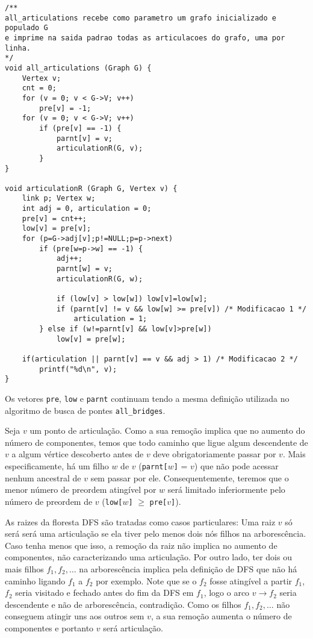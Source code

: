 \documentclass[12pt, a4paper, oneside]{article}
\begin{document}
\begin{lstlisting}
/**
all_articulations recebe como parametro um grafo inicializado e populado G
e imprime na saida padrao todas as articulacoes do grafo, uma por linha.
*/
void all_articulations (Graph G) {
	Vertex v;
	cnt = 0;
	for (v = 0; v < G->V; v++)
		pre[v] = -1;
	for (v = 0; v < G->V; v++)
		if (pre[v] == -1) {
			parnt[v] = v;
			articulationR(G, v);
		}
}

void articulationR (Graph G, Vertex v) {
	link p; Vertex w;
	int adj = 0, articulation = 0;
	pre[v] = cnt++;
	low[v] = pre[v];
	for (p=G->adj[v];p!=NULL;p=p->next)
		if (pre[w=p->w] == -1) {
			adj++;
			parnt[w] = v;
			articulationR(G, w);
			
			if (low[v] > low[w]) low[v]=low[w];
			if (parnt[v] != v && low[w] >= pre[v]) /* Modificacao 1 */
				articulation = 1;
		} else if (w!=parnt[v] && low[v]>pre[w])
			low[v] = pre[w];
			
	if(articulation || parnt[v] == v && adj > 1) /* Modificacao 2 */
		printf("%d\n", v);
}
\end{lstlisting}

Os vetores \texttt{pre}, \texttt{low} e \texttt{parnt} continuam tendo a mesma definição utilizada
no algoritmo de busca de pontes \texttt{all\_bridges}.
 
Seja $v$ um ponto de articulação. Como a sua remoção implica que no aumento do número de componentes,
temos que todo caminho que ligue algum descendente de $v$ a algum vértice descoberto antes de $v$ deve obrigatoriamente
passar por $v$. Mais especificamente, há um filho $w$ de $v$ (\texttt{parnt[$w$]} = $v$) que não pode 
acessar nenhum ancestral de $v$ sem passar por ele. Consequentemente, teremos que o menor número de
preordem atingível por $w$ será limitado inferiormente pelo número de preordem de $v$ (\texttt{low[$w$]}
$\ge$ \texttt{pre[$v$]}).

As raizes da floresta DFS são tratadas como casos particulares: Uma raiz $v$ só será será uma articulação 
se ela tiver pelo menos dois nós filhos na arborescência. Caso tenha menos que isso, a remoção
da raiz não implica no aumento de componentes, não caracterizando uma articulação. Por outro lado, 
ter dois ou mais filhos $f_1, f_2, \ldots$ na arborescência implica pela definição de DFS que não 
há caminho ligando $f_1$ a $f_2$ por exemplo. Note que se o $f_2$ fosse atingível a partir $f_1$, $f_2$ seria
visitado e fechado antes do fim da DFS em $f_1$, logo o arco $v \rightarrow f_2$ seria descendente e não de
arborescência, contradição. Como os filhos $f_1, f_2, \ldots$ não conseguem atingir uns aos outros sem $v$,
a sua remoção aumenta o número de componentes e portanto $v$ será articulação.
\end{document}
